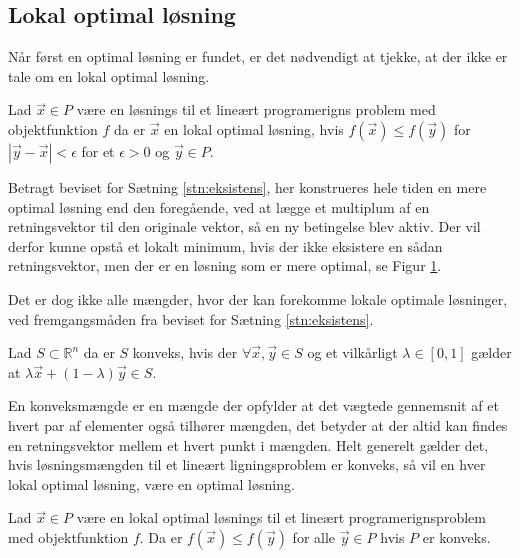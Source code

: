 \subsection{Lokal optimal løsning}
Når først en optimal løsning er fundet, er det nødvendigt at tjekke, at der ikke er tale om en lokal optimal løsning.
\begin{defn}
Lad $\vec{x} \in P$ være en løsnings til et lineært programerigns problem med objektfunktion $f$ da er $\vec{x}$ en lokal optimal løsning, hvis $f(\vec{x}) \leq f(\vec{y})$ for $|\vec{y}-\vec{x}|< \epsilon$ for et $\epsilon > 0$ og $\vec{y} \in P$.
\end{defn}
Betragt beviset for Sætning \ref{stn:eksistens}, her konstrueres hele tiden en mere optimal løsning end den foregående, ved at lægge et multiplum af en retningsvektor til den originale vektor, så en ny betingelse blev aktiv.
Der vil derfor kunne opstå et lokalt minimum, hvis der ikke eksistere en sådan retningsvektor, men der er en løsning som er mere optimal, se Figur \ref{fig:lokaltmin}.
\begin{figure}
\begin{center}
	
	\label{fig:lokaltmin}
\end{center}
\end{figure}
Det er dog ikke alle mængder, hvor der kan forekomme lokale optimale løsninger, ved fremgangsmåden fra beviset for Sætning \ref{stn:eksistens}.
\begin{defn} 
Lad $S \subset \mathds{R}^n$  da er $S$ konveks, hvis der $\forall \vec{x}, \vec{y} \in S$ og et vilkårligt $\lambda \in [0,1]$ gælder at $\lambda \vec{x} + (1-\lambda) \vec{y} \in S$.
\label{def:Konveks}
\end{defn}
En konveksmængde er en mængde der opfylder at det vægtede gennemsnit af et hvert par af elementer også tilhører mængden, det betyder at der altid kan findes en retningsvektor mellem et hvert punkt i mængden.
Helt generelt gælder det, hvis løsningsmængden til et lineært ligningsproblem er konveks, så vil en hver lokal optimal løsning, være en optimal løsning.
\begin{stn}
Lad $\vec{x} \in P$ være en lokal optimal løsnings til et lineært programerignsproblem  med objektfunktion $f$.
Da er  $f(\vec{x}) \leq f(\vec{y})$ for alle $\vec{y} \in P$ hvis $P$ er konveks.
\end{stn}
